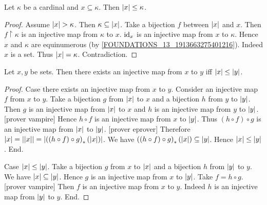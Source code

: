 \documentclass[../set-theory.tex]{subfiles}
\begin{document}
  \begin{forthel}
    \begin{proposition}
      Let $\kappa$ be a cardinal and $x \subseteq \kappa$.
      Then $\left\vert x\right\vert \leq \kappa$.
    \end{proposition}
    \begin{proof}
      Assume $\left\vert x\right\vert > \kappa$.
      Then $\kappa \subseteq \left\vert x\right\vert$.
      Take a bijection $f$ between $\left\vert x\right\vert$ and $x$.
      Then $f \restriction \kappa$ is an injective map from $\kappa$ to $x$.
      $\mathrm{id}_{x}$ is an injective map from $x$ to $\kappa$.
      Hence $x$ and $\kappa$ are equinumerous (by
      \cref{FOUNDATIONS_13_1913663275401216}).
      Indeed $x$ is a set.
      Thus $\left\vert x\right\vert = \kappa$.
      Contradiction.
    \end{proof}
  \end{forthel}

  \begin{forthel}
    \begin{proposition}
      Let $x, y$ be sets.
      Then there exists an injective map from $x$ to $y$ iff $\left\vert x\right\vert \leq \left\vert y\right\vert$.
    \end{proposition}
    \begin{proof}
      Case there exists an injective map from $x$ to $y$.
        Consider an injective map $f$ from $x$ to $y$.
        Take a bijection $g$ from $\left\vert x\right\vert$ to $x$ and a bijection $h$ from $y$ to
        $\left\vert y\right\vert$.
        Then $g$ is an injective map from $\left\vert x\right\vert$ to $x$ and $h$ is an injective
        map from $y$ to $\left\vert y\right\vert$.
        [prover vampire]
        Hence $h \circ f$ is an injective map from $x$ to $\left\vert y\right\vert$.
        Thus $(h \circ f) \circ g$ is an injective map from $\left\vert x\right\vert$ to $\left\vert y\right\vert$.
        [prover eprover]
        Therefore $\left\vert x\right\vert
          = \left\vert\left\vert x\right\vert\right\vert
          = \left\vert\left((h \circ f) \circ g\right)_{*}(\left\vert x\right\vert)\right\vert$.
        We have $\left((h \circ f) \circ g\right)_{*}(\left\vert x\right\vert) \subseteq \left\vert y\right\vert$.
        Hence $\left\vert x\right\vert \leq \left\vert y\right\vert$.
      End.

      Case $\left\vert x\right\vert \leq \left\vert y\right\vert$.
        Take a bijection $g$ from $x$ to $\left\vert x\right\vert$ and a bijection $h$ from $\left\vert y\right\vert$ to
        $y$.
        We have $\left\vert x\right\vert \subseteq \left\vert y\right\vert$.
        Hence $g$ is an injective map from $x$ to $\left\vert y\right\vert$.
        Take $f = h \circ g$.
        [prover vampire]
        Then $f$ is an injective map from $x$ to $y$.
        Indeed $h$ is an injective map from $\left\vert y\right\vert$ to $y$.
      End.
    \end{proof}
  \end{forthel}
\end{document}
